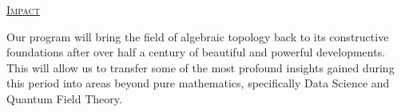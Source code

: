 
{\centering\underline{\textsc{Impact}}\par}
\smallskip Our program will bring the field of algebraic topology back to its constructive foundations after over half a century of beautiful and powerful developments.
This will allow us to transfer some of the most profound insights gained during this period into areas beyond pure mathematics, specifically Data Science and Quantum Field Theory.